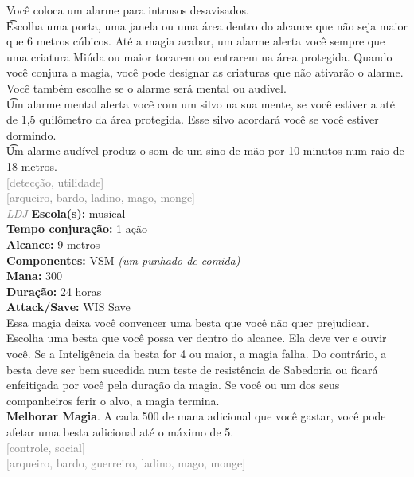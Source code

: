 \documentclass{RPG_Adventure}[2021/10/20]
\begin{document}
{\normalsize Você coloca um alarme para intrusos desavisados.\\\t Escolha uma porta, uma janela ou uma área dentro do alcance que não seja maior que 6 metros cúbicos. Até a magia acabar, um alarme alerta você sempre que uma criatura Miúda ou maior tocarem ou entrarem na área protegida. Quando você conjura a magia, você pode designar as criaturas que não ativarão o alarme. Você também escolhe se o alarme será mental ou audível.\\\t Um alarme mental alerta você com um silvo na sua mente, se você estiver a até de 1,5 quilômetro da área protegida. Esse silvo acordará você se você estiver dormindo.\\\t Um alarme audível produz o som de um sino de mão por 10 minutos num raio de 18 metros. \\}
{\scriptsize \textcolor{gray}{[detecção, utilidade]\\}}
{\scriptsize \textcolor{gray}{[arqueiro, bardo, ladino, mago, monge]\\}}
{\tiny \textcolor{gray}{\textit{LDJ}}}
{\small \t \textbf{Escola(s):} musical\\\t \textbf{Tempo conjuração:} 1 ação\\\t \textbf{Alcance:} 9 metros\\\t \textbf{Componentes:} VSM \textit{(um punhado de comida)}\\\t \textbf{Mana:} 300\\\t \textbf{Duração:} 24 horas\\\t \textbf{Attack/Save:} WIS Save\\}
{\normalsize Essa magia deixa você convencer uma besta que você não quer prejudicar. Escolha uma besta que você possa ver dentro do alcance. Ela deve ver e ouvir você. Se a Inteligência da besta for 4 ou maior, a magia falha. Do contrário, a besta deve ser bem sucedida num teste de resistência de Sabedoria ou ficará enfeitiçada por você pela duração da magia. Se você ou um dos seus companheiros ferir o alvo, a magia termina.\\\t \textbf{Melhorar Magia}. A cada 500 de mana adicional que você gastar, você pode afetar uma besta adicional até o máximo de 5.\\}
{\scriptsize \textcolor{gray}{[controle, social]\\}}
{\scriptsize \textcolor{gray}{[arqueiro, bardo, guerreiro, ladino, mago, monge]\\}}
\end{document}
